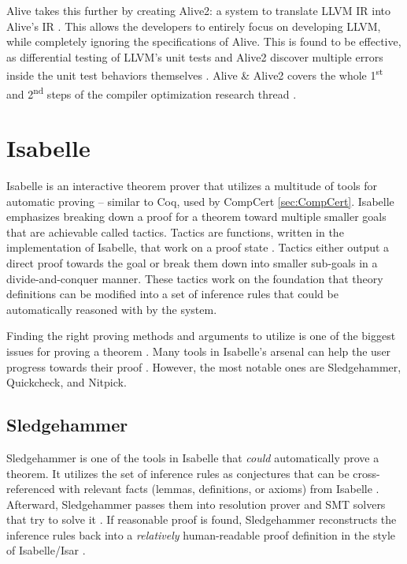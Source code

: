 Alive takes this further by creating Alive2: a system to translate LLVM IR into Alive's IR \cite{Alive2}. This allows the developers to entirely 
focus on developing LLVM, while completely ignoring the specifications of Alive. This is found to be effective, as differential testing of 
LLVM's unit tests and Alive2 discover multiple errors inside the unit test behaviors themselves \cite[Sec. 8.2]{Alive2}. Alive \& Alive2 covers 
the whole 1\textsuperscript{st} and 2\textsuperscript{nd} steps of the compiler optimization research thread \cite[p. 5]{CompilerOptimization}.

\section{Isabelle}
\label{sec:Isabelle}

Isabelle is an interactive theorem prover that utilizes a multitude of tools for automatic proving -- similar to Coq, used by CompCert 
\ref{sec:CompCert}. Isabelle emphasizes breaking down a proof 
for a theorem toward multiple smaller goals that are achievable called tactics. Tactics are functions, written in the implementation of Isabelle, 
that work on a proof state \cite{isabelleProof}. Tactics either output a direct proof towards the goal or break them down into smaller sub-goals 
in a divide-and-conquer manner. These tactics work on the foundation that theory definitions can be modified into a set of inference rules that 
could be automatically reasoned with by the system.

Finding the right proving methods and arguments to utilize is one of the biggest issues for proving a theorem \cite{isabelleProof}. 
Many tools in Isabelle's arsenal can help the user progress towards their proof \cite{IsabelleHOL}. However, the most notable ones are 
Sledgehammer, Quickcheck, and Nitpick.


\subsection{Sledgehammer}
\label{sec:Sledgehammer}

Sledgehammer is one of the tools in Isabelle that \emph{could} automatically prove a theorem. It utilizes the set of inference rules as 
conjectures that can be cross-referenced with relevant facts (lemmas, definitions, or axioms) from Isabelle \cite[Sec. 3]{isabelleProof}. 
Afterward, Sledgehammer passes them into resolution prover and SMT solvers that try to solve it \cite[Sec. 3.3]{isabelleProof}. If reasonable 
proof is found, Sledgehammer reconstructs the inference rules back into a \emph{relatively} human-readable proof definition in the style of 
Isabelle/Isar \cite[Sec. 3.4]{isabelleProof}.

